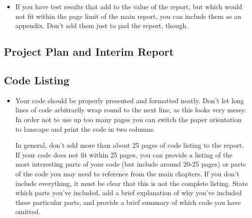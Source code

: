 \begin{mdframed}
	\begin{itemize}
		\item If you have test results that add to the value of the report, but which would not fit within the page limit of the main report, you can include them as an appendix. Don't add them just to pad the report, though.
	\end{itemize}
\end{mdframed}

\subsection{Project Plan and Interim Report}



\subsection{Code Listing}

\begin{mdframed}
	\begin{itemize}
		\item Your code should be properly presented and formatted neatly. Don't let long lines of code arbitrarily wrap round to the next line, as this looks very messy. In order not to use up too many pages you can switch the paper orientation to lanscape and print the code in two columns.

		In general, don't add more than about 25 pages of code listing to the report. If your code does not fit within 25 pages, you can provide a listing of the most interesting parts of your code (but include around 20-25 pages) or parts of the code you may need to reference from the main chapters. If you don't include everything, it must be clear that this is not the complete listing. State which parts you've included, add a brief explanation of why you've included these particular parts, and provide a brief summary of which code you have omitted.
	\end{itemize}
\end{mdframed}
